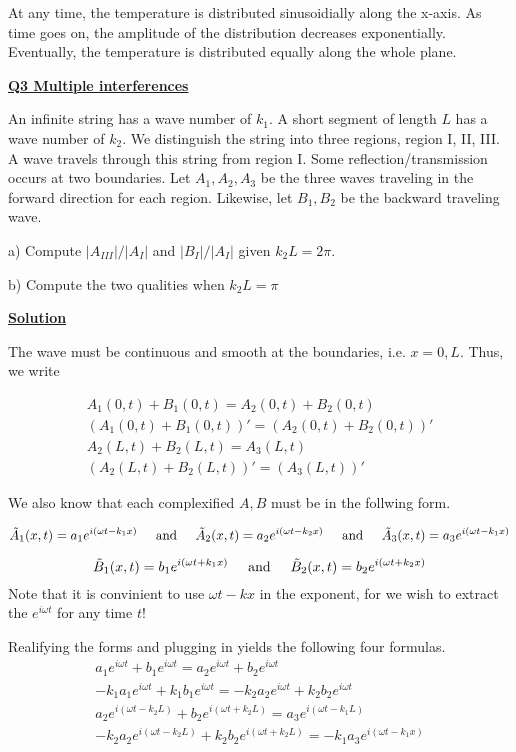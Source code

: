 \documentclass{article}
\newcommand{\new}[1]{
    \vspace{2mm}
    \noindent
    \textbf{
    \underline{#1}}
}
\newcommand{\textAnd}{
    {
        \hspace{5mm}
        \textrm{and}
        \hspace{5mm}
    }
}
\newcommand{\Ixp}[1]{
    {
        e^{i{#1}}
    }
}
\begin{document}
At any time, the temperature is distributed sinusoidially along 
the x-axis. As time goes on, the amplitude of the distribution 
decreases exponentially. Eventually, the temperature is distributed 
equally along the whole plane. 


\new{Q3 Multiple interferences}

An infinite string has a wave number of $k_1$. A short segment 
of length $L$ has a wave number of $k_2$. We distinguish the 
string into three regions, region I, II, III. A wave travels 
through this string from region I. Some reflection/transmission 
occurs at two boundaries. Let $A_1, A_2, A_3$ be the 
three waves traveling in the forward direction for each region. 
Likewise, let $B_1, B_2$ be the backward traveling wave. 

a) Compute $|A_{III}|/ |A_{I}|$ and $|B_I| / |A_I|$ given 
$k_2L = 2\pi$. 

b) Compute the two qualities when $k_2L = \pi$

\new{Solution}
The wave must be continuous and smooth at the boundaries, i.e. 
$x = 0, L$. Thus, we write 

\begin{align*}
    A_1(0, t) + B_1(0, t) = A_2(0, t) + B_2(0, t)\\
    (A_1(0, t) + B_1(0, t))' = (A_2(0, t) + B_2(0, t))'\\
    A_2(L, t) + B_2(L, t) = A_3(L, t)\\
    (A_2(L, t) + B_2(L, t))' = (A_3(L, t))'
\end{align*}

We also know that each complexified $A, B$ must be in the follwing form.

\[
    \tilde A_1(x, t) = a_1 \Ixp{(\omega t - k_1 x)}
    \textAnd 
    \tilde A_2(x, t) = a_2 \Ixp{(\omega t- k_2 x)}
    \textAnd
    \tilde A_3(x, t) = a_3 \Ixp{(\omega t - k_1 x)}
\]

\[
    \tilde B_1(x, t) = b_1 \Ixp{(\omega t + k_1 x)}
    \textAnd 
    \tilde B_2(x, t) = b_2 \Ixp{(\omega t + k_2 x)}
\]
\color{red}
Note that it is convinient to use $\omega t - kx$ in the exponent, 
for we wish to extract the $\Ixp{\omega t}$ for any time $t$!
\color{black}

Realifying the forms and plugging in yields the following four formulas. 
\begin{align}
    a_1 \Ixp{\omega t} + b_1 \Ixp{\omega t}
     = a_2 \Ixp {\omega t} + b_2 \Ixp{\omega t}
    \nonumber \\
    -k_1a_1 \Ixp{\omega t} + k_1b_1 \Ixp{\omega t}
     = -k_2 a_2 \Ixp{\omega t} + k_2 b_2 \Ixp{\omega t}
    \nonumber  \\
     a_2 \Ixp{(\omega t - k_2 L)} + b_2 \Ixp{(\omega t + k_2 L)}
     = 
     a_3 \Ixp{(\omega t - k_1 L)}
    \nonumber \\
     -k_2a_2 \Ixp {(\omega t - k_2 L)}+ k_2b_2 \Ixp{(\omega t + k_2 L)}
     = 
     -k_1 a_3 \Ixp{(\omega t - k_1 x)}
\end{align}
\end{document}
